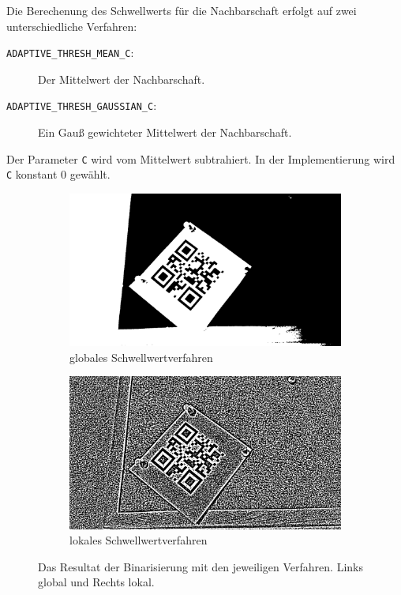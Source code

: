 Die Berechenung des Schwellwerts für die Nachbarschaft erfolgt auf zwei unterschiedliche Verfahren:
\begin{description}
	\item[\texttt{ADAPTIVE\_THRESH\_MEAN\_C}:] Der Mittelwert der Nachbarschaft.
	\item[\texttt{ADAPTIVE\_THRESH\_GAUSSIAN\_C}:] Ein Gauß gewichteter Mittelwert der Nachbarschaft.
\end{description}

Der Parameter \texttt{C} wird vom Mittelwert subtrahiert. In der Implementierung wird \texttt{C} konstant $0$ gewählt.

\begin{figure}[h]
\centering
\begin{subfigure}[t]{0.48\textwidth}
\centering
\includegraphics[scale=0.12]{images/qrcode-adler-wand_1___BINARIZED___.jpg}
\caption{globales Schwellwertverfahren}
\end{subfigure}%
\begin{subfigure}[t]{0.48\textwidth}
\centering
\includegraphics[scale=0.12]{images/qrcode-adler-wand_2___BINARIZED___.jpg}
\caption{lokales Schwellwertverfahren}
\end{subfigure}
\caption{Das Resultat der Binarisierung mit den jeweiligen Verfahren. Links global und Rechts lokal.}
\end{figure}